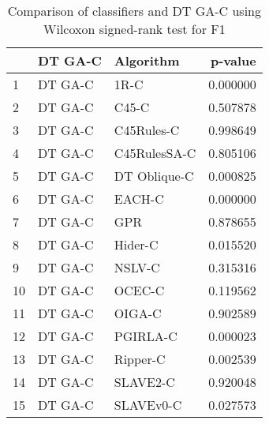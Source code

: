 \begin{table}
\footnotesize
\caption{Comparison of classifiers and DT GA-C using Wilcoxon signed-rank test for F1}
\label{tab:DT GA-C wilcoxon F1 comparison}
\begin{tabular}{lllr}
\hline
 & DT GA-C & Algorithm & p-value \\
\hline
1 & DT GA-C & 1R-C & 0.000000 \\
2 & DT GA-C & C45-C & 0.507878 \\
3 & DT GA-C & C45Rules-C & 0.998649 \\
4 & DT GA-C & C45RulesSA-C & 0.805106 \\
5 & DT GA-C & DT Oblique-C & 0.000825 \\
6 & DT GA-C & EACH-C & 0.000000 \\
7 & DT GA-C & GPR & 0.878655 \\
8 & DT GA-C & Hider-C & 0.015520 \\
9 & DT GA-C & NSLV-C & 0.315316 \\
10 & DT GA-C & OCEC-C & 0.119562 \\
11 & DT GA-C & OIGA-C & 0.902589 \\
12 & DT GA-C & PGIRLA-C & 0.000023 \\
13 & DT GA-C & Ripper-C & 0.002539 \\
14 & DT GA-C & SLAVE2-C & 0.920048 \\
15 & DT GA-C & SLAVEv0-C & 0.027573 \\
\hline
\end{tabular}
\end{table}
